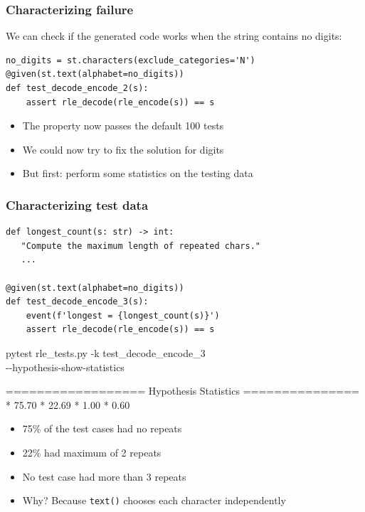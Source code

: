 \documentclass{beamer}
\begin{document}
\begin{frame}[fragile]
  \frametitle{Characterizing failure}

  We can check if the generated code
  works when the string contains no digits:
\begin{verbatim}
no_digits = st.characters(exclude_categories='N')
@given(st.text(alphabet=no_digits))
def test_decode_encode_2(s):
    assert rle_decode(rle_encode(s)) == s
\end{verbatim}

  \begin{itemize}
  \item The property now passes the default 100 tests
  \item We could now try to fix the solution for digits
  \item But first: perform some statistics on the testing data
  \end{itemize}
\end{frame}

\begin{frame}
  \frametitle{Characterizing test data}

\begin{verbatim}
def longest_count(s: str) -> int:
   "Compute the maximum length of repeated chars."
   ...

@given(st.text(alphabet=no_digits))
def test_decode_encode_3(s):
    event(f'longest = {longest_count(s)}')
    assert rle_decode(rle_encode(s)) == s
\end{verbatim}

  \framebreak
  
\begin{semiverbatim}
pytest rle_tests.py -k test_decode_encode_3 \\
        -{}-hypothesis-show-statistics

================== Hypothesis Statistics ===============
      * 75.70%
      * 22.69%
      * 1.00%
      * 0.60%
\end{semiverbatim}

\begin{itemize}
\item 75\% of the test cases had no repeats
\item 22\% had maximum of 2 repeats
\item No test case had more than 3 repeats
\item Why? Because \texttt{text()} 
   chooses each character independently
\end{itemize}
\end{frame}
\end{document}
